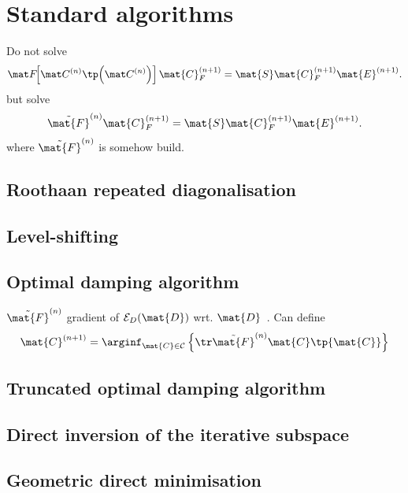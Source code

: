 \section{Standard \SCF algorithms}
\label{sec:SCFAlgorithms}

Do not solve
\begin{equation}
	\matFnfull
	\mat{C}_F^{(n+1)} = \mat{S} \mat{C}_F^{(n+1)} \mat{E}^{(n+1)}.
	\label{eqn:HFiterated}
\end{equation}
but solve 
\begin{equation}
	\tilde{\mat{F}}^{(n)}
	\mat{C}_F^{(n+1)} = \mat{S} \mat{C}_F^{(n+1)} \mat{E}^{(n+1)}.
	\label{eqn:HFiterated}
\end{equation}
where $\tilde{\mat{F}}^{(n)}$ is somehow build.



\subsection{Roothaan repeated diagonalisation}

\subsection{Level-shifting}

\subsection{Optimal damping algorithm}
\label{sec:ODA}
$\tilde{\mat{F}}^{(n)}$ gradient of $\mathcal{E}_D(\mat{D})$
wrt. $\mat{D}$~\cite{Lions1988,Cances2000}.
Can define~\cite{Lions1988,Cances2000}
\[
	\mat{C}^{(n+1)} = \arginf_{\mat{C} \in \mathcal{C}}
\left\{ \tr \tilde{\mat{F}}^{(n)} \mat{C} \tp{\mat{C}} \right\} \]

\subsection{Truncated optimal damping algorithm}

\subsection{Direct inversion of the iterative subspace}

\subsection{Geometric direct minimisation}
